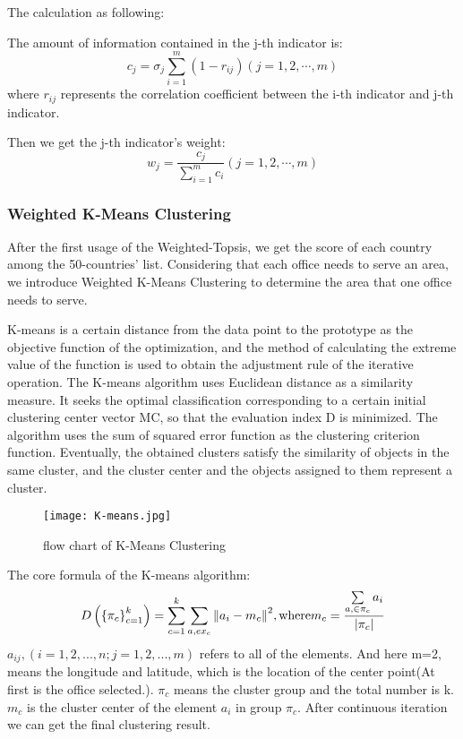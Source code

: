 \documentclass[12pt]{article}  %
\begin{document}
\begin{itemize}
	The calculation as following:
	
	The amount of information contained in the j-th indicator is:
	\begin{equation}
	{c_j} = {\sigma _j}\sum\limits_{i = 1}^m {(1 - {r_{ij}})(j = 1,2, \cdots ,m)} 
	\end{equation}
	where ${r_{ij}}$ represents the correlation coefficient between the i-th indicator and j-th indicator.
	
	Then we get the j-th indicator's weight:
	\begin{equation}
	{w_j} = \frac{{{c_j}}}{{\sum\limits_{i = 1}^m {{c_i}} }}(j = 1,2, \cdots ,m)
	\end{equation}
\end{itemize}

\subsubsection{Weighted K-Means Clustering}
After the first usage of the Weighted-Topsis, we get the score of each country among the 50-countries' list. Considering that each office needs to serve an area, we introduce Weighted K-Means Clustering to determine the area that one office needs to serve.

K-means is a certain distance from the data point to the prototype as the objective function of the optimization, and the method of calculating the extreme value of the function is used to obtain the adjustment rule of the iterative operation. The K-means algorithm uses Euclidean distance as a similarity measure. It seeks the optimal classification corresponding to a certain initial clustering center vector MC, so that the evaluation index D is minimized. The algorithm uses the sum of squared error function as the clustering criterion function. Eventually, the obtained clusters satisfy the similarity of objects in the same cluster, and the cluster center and the objects assigned to them represent a cluster.

\begin{figure}[H]
	\centering
	\texttt{[image: K-means.jpg]}
	\caption{flow chart of K-Means Clustering}\label{fig:K-means}
\end{figure}

The core formula of the K-means algorithm:
\begin{equation}
D\left( {\left\{ {{\pi _c}} \right\}_{c = 1}^k} \right) = \sum\limits_{c = 1}^k {\sum\limits_{a,e{x_c}} {{{\left\| {{a_i} - {m_c}} \right\|}^2}} } ,{\rm{ where }}{m_c} = \frac{{\sum\limits_{a, \in {\pi _c}} {{a_i}} }}{{\left| {{\pi _c}} \right|}}
\end{equation}
${a_{ij}},\left( {i = 1,2,...,n;j = 1,2,...,m} \right)$ refers to all of the elements. And here m=2, means the longitude and latitude, which is the location of the center point(At first is the office selected.). ${\pi _c}$ means the cluster group and the total number is k. ${m_c}$ is the cluster center of the element ${a_i}$ in group ${\pi _c}$. After continuous iteration we can get the final clustering result.
\end{document}
